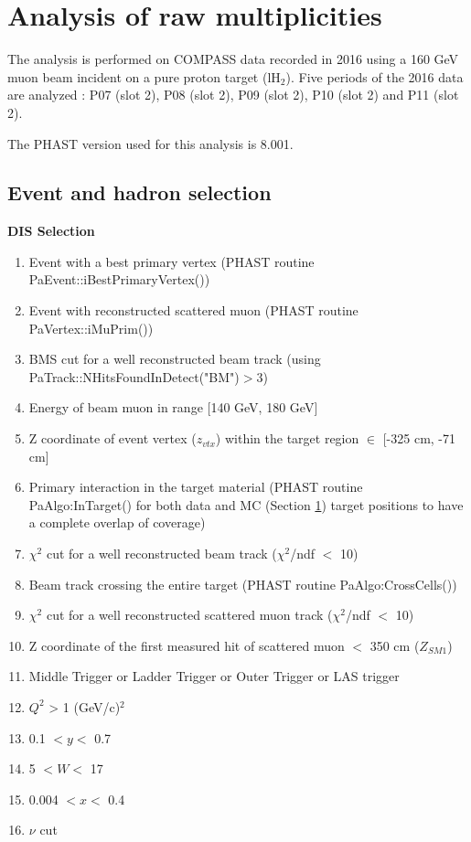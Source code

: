 \documentclass[letterpaper,12pt]{article}
\begin{document}
\section{Analysis of raw multiplicities} \label{Raw}

The analysis is performed on COMPASS data recorded in 2016 using a 160 GeV muon beam incident on a pure proton target (lH$_2$).
Five periods of the 2016 data are analyzed : P07 (slot 2), P08 (slot 2), P09 (slot 2), P10 (slot 2) and P11 (slot 2).

The PHAST version used for this analysis is 8.001.

\subsection{Event and hadron selection}

\hfill
\newline

\textbf{DIS Selection}
\begin{enumerate}
	\item Event with a best primary vertex (PHAST routine PaEvent::iBestPrimaryVertex())
	\item Event with reconstructed scattered muon (PHAST routine PaVertex::iMuPrim())
	\item BMS cut for a well reconstructed beam track (using PaTrack::NHitsFoundInDetect("BM")$>$3)
	\item Energy of beam muon in range [140 GeV, 180 GeV]
	\item Z coordinate of event vertex ($z_{vtx}$) within the target region $\in$ [-325 cm, -71 cm]
	\item Primary interaction in the target material (PHAST routine PaAlgo:InTarget() for both data and MC (Section \ref{Raw}) target positions
				to have a complete overlap of coverage)
	\item $\chi^2$ cut for a well reconstructed beam track ($\chi^2$/ndf $<$ 10)
	\item Beam track crossing the entire target (PHAST routine PaAlgo:CrossCells())
	\item $\chi^2$ cut for a well reconstructed scattered muon track ($\chi^2$/ndf $<$ 10)
	\item Z coordinate of the first measured hit of scattered muon $<$ 350 cm ($Z_{SM1}$)
	\item Middle Trigger or Ladder Trigger or Outer Trigger or LAS trigger
	\item $Q^2$ > 1 (GeV/c)$^2$
	\item 0.1 $< y <$ 0.7
	\item 5 $< W <$ 17
	\item 0.004 $< x <$ 0.4
	\item $\nu$ cut
\end{enumerate}
\end{document}

